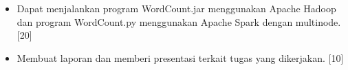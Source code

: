 \documentclass[a4paper]{tufte-handout}
\begin{document}
\begin{itemize}
\item Dapat menjalankan program WordCount.jar menggunakan Apache Hadoop dan program WordCount.py menggunakan Apache Spark dengan multinode. [20]
\item Membuat laporan dan memberi presentasi terkait tugas yang dikerjakan. [10]

\begin{comment}
\newday{TRKJ-3A}
\item Kelas TRKJ-3B
\begin{table}[!ht]
\caption{Nama Peserta dan Kelompok Kelas TRKJ-3B}
\label{tab:peserta}
\centering
\begin{tabular}{lll} 
\toprule
Nama &	Hostname	& IP Address \\
\midrule
Kelompok 1\\
\midrule
Ajrial Akbar Wijaya		& master	& 192.168.2.110 \\
Alif Fulhaq 			& slave1	& 192.168.2.111 \\
Annisa Meyra			& slave2	& 192.168.2.112 \\
Aufar					& slave3	& 192.168.2.113 \\
\midrule
Kelompok 2\\
\midrule
Hilman Asy'ari			& master	& 192.168.2.120 \\
Delva Hamnur			& slave1	& 192.168.2.121 \\
Erwind Toy Mirip		& slave2	& 192.168.2.122 \\
Gusti Sanjaya			& slave3	& 192.168.2.123 \\
Khazinatul Asrar T		& slave4	& 192.168.2.124 \\
\midrule
Kelompok 3\\
\midrule
Lil Hamdi				& master	& 192.168.2.130 \\
M. Arief Fadillah		& slave1	& 192.168.2.131 \\
Muhammad Habibillah		& slave2	& 192.168.2.132 \\
Muhammad Irfan			& slave3	& 192.168.2.133 \\
Muhammad Rafli			& slave4	& 192.168.2.134 \\
\midrule
Kelompok 4\\
\midrule
Mutia Nursyifa			& master	& 192.168.2.140 \\
Muhammad Reza			& slave1	& 192.168.2.141 \\
Muhammad Riyan			& slave2	& 192.168.2.142 \\
Naila Dwi Adhini		& slave3	& 192.168.2.143 \\
\midrule
Kelompok 5\\
\midrule
Zulfikar Achyar			& master	& 192.168.2.150 \\
Rafli Alwinsyah			& slave1	& 192.168.2.151 \\
Rizki Maulana			& slave2	& 192.168.2.152 \\
Sayed Furqan			& slave3	& 192.168.2.153 \\
\midrule
\end{tabular}
\end{table}
\end{comment}
\end{itemize}
\end{document}
